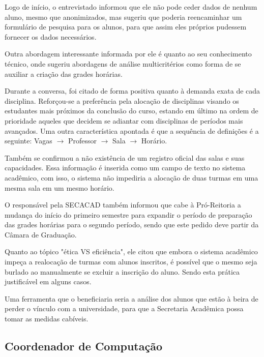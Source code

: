 
Logo de início, o entrevistado informou que ele não pode ceder dados de nenhum aluno, mesmo que anonimizados, mas sugeriu que poderia reencaminhar um formulário de pesquisa para os alunos, para que assim eles próprios pudessem fornecer os dados necessários.

Outra abordagem interessante informada por ele é quanto ao seu conhecimento técnico, onde sugeriu abordagens de análise multicritérios como forma de se auxiliar a criação das grades horárias.

Durante a conversa, foi citado de forma positiva quanto à demanda exata de cada disciplina. Reforçou-se a preferência pela alocação de disciplinas visando os estudantes mais próximos da conclusão do curso, estando em último na ordem de prioridade aqueles que decidem se adiantar com disciplinas de períodos mais avançados. Uma outra característica apontada é que a sequência de definições é a seguinte: Vagas $\rightarrow$ Professor $\rightarrow$ Sala $\rightarrow$ Horário.

Também se confirmou a não existência de um registro oficial das salas e suas capacidades. Essa informação é inserida como um campo de texto no sistema acadêmico, com isso, o sistema não impediria a alocação de duas turmas em uma mesma sala em um mesmo horário.

O responsável pela SECACAD também informou que cabe à Pró-Reitoria a mudança do início do primeiro semestre para expandir o período de preparação das grades horárias para o segundo período, sendo que este pedido deve partir da Câmara de Graduação.

Quanto ao tópico "ética VS eficiência", ele citou que embora o sistema acadêmico impeça a realocação de turmas com alunos inscritos, é possível que o mesmo seja burlado ao manualmente se excluir a inscrição do aluno. Sendo esta prática justificável em alguns casos.

Uma ferramenta que o beneficiaria seria a análise dos alunos que estão à beira de perder o vínculo com a universidade, para que a Secretaria Acadêmica possa tomar as medidas cabíveis.

\subsection{Coordenador de Computação} %

